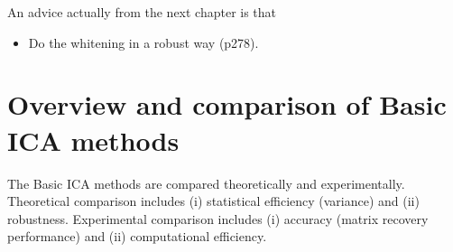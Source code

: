 \documentclass[a4paper, one	side]{book}
\begin{document}
An advice actually from the next chapter is that

\begin{itemize}
\item Do the whitening in a robust way (p278).
\end{itemize}









\chapter{Overview and comparison of Basic ICA methods}

The Basic ICA methods are compared theoretically and experimentally. Theoretical comparison includes (i) statistical efficiency (\ie variance) and (ii) robustness. Experimental comparison includes (i) accuracy (\ie matrix recovery performance) and (ii) computational efficiency. 
\end{document}
